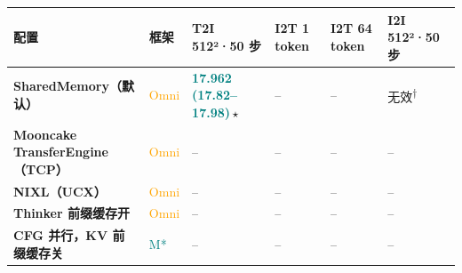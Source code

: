 \begin{tabularx}{\textwidth}{>{\bfseries}p{4.3cm} p{1.0cm} Y Y Y Y}
\toprule
{}
配置 & 框架 & T2I 512²·50 步 & I2T 1 token & I2T 64 token & I2I 512²·50 步 \\
\midrule
SharedMemory（默认） & \textcolor{Orange}{Omni} & \textbf{\textcolor{Teal}{17.962\,\textcolor{Muted}{(17.82--17.98)}}}\,$\star$ & -- & -- & \textcolor{Muted}{无效\textsuperscript{†}} \\
Mooncake TransferEngine（TCP） & \textcolor{Orange}{Omni} & -- & -- & -- & -- \\
NIXL（UCX） & \textcolor{Orange}{Omni} & -- & -- & -- & -- \\
Thinker 前缀缓存开 & \textcolor{Orange}{Omni} & -- & -- & -- & -- \\
CFG 并行，KV 前缀缓存关 & \textcolor{Teal}{M*} & -- & -- & -- & -- \\
\bottomrule
\end{tabularx}
